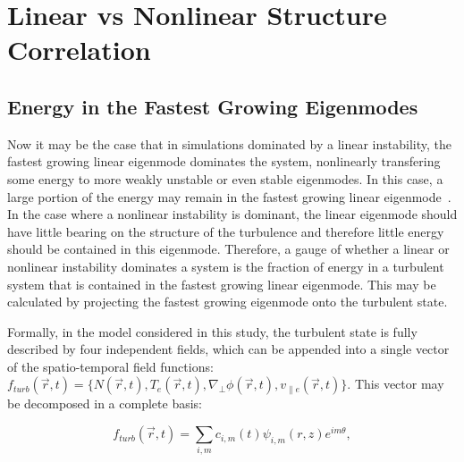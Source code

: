 \documentclass[showpacs,preprintnumbers,amsmath,amssymb,superscriptaddress,aip]{revtex4-1}
\def\beq{\begin{equation}}
\def\eeq{\end{equation}}
\def\grad{\nabla}
\newcommand{\gradperp}{\grad_\perp}
\newcommand{\vpe}{v_{\parallel e}}
\begin{document}
\section{Linear vs Nonlinear Structure Correlation}
\label{Sec_lin_vs_nl}
\subsection{Energy in the Fastest Growing Eigenmodes}
\label{subsec_en_eigenmodes}

Now it may be the case that in simulations dominated by a linear instability, the fastest growing linear
eigenmode dominates the system, nonlinearly transfering some energy to more weakly unstable or even stable eigenmodes. In this case, a large portion of the energy may remain in the fastest
growing linear eigenmode~\cite{hatch2011}. In the case where a nonlinear instability is dominant, the linear eigenmode should have little bearing on the structure of the turbulence and therefore little
energy should be contained in this eigenmode. Therefore, a gauge of whether a linear or nonlinear instability dominates a system is the fraction of energy in a turbulent system
that is contained in the fastest growing linear eigenmode. This may be calculated by projecting the fastest growing eigenmode onto the turbulent state.

Formally, in the model considered in this study, the turbulent state is fully described by four independent fields, which can be appended into a single vector of the spatio-temporal field functions: 
$f_{turb}(\vec{r},t) = \{N(\vec{r},t),T_e(\vec{r},t),\gradperp \phi(\vec{r},t), \vpe(\vec{r},t)\}$. This vector may be decomposed in a complete basis:

\beq
\label{basis_decomp}
f_{turb}(\vec{r},t) = \sum_{i,m} c_{i,m}(t) \psi_{i,m}(r,z) e^{i m \theta},
\eeq
\end{document}

